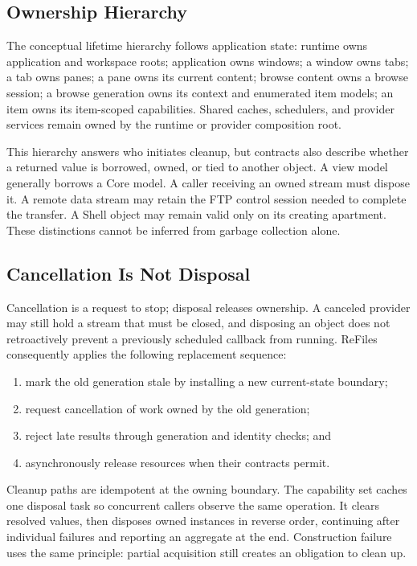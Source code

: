 \documentclass[10pt,a4paper,twoside]{article}
\begin{document}
\subsection{Ownership Hierarchy}

The conceptual lifetime hierarchy follows application state: runtime owns application and workspace roots;
application owns windows; a window owns tabs; a tab owns panes; a pane owns its current content; browse content
owns a browse session; a browse generation owns its context and enumerated item models; an item owns its
item-scoped capabilities. Shared caches, schedulers, and provider services remain owned by the runtime or provider
composition root.

This hierarchy answers who initiates cleanup, but contracts also describe whether a returned value is borrowed,
owned, or tied to another object. A view model generally borrows a Core model. A caller receiving an owned stream
must dispose it. A remote data stream may retain the FTP control session needed to complete the transfer. A Shell
object may remain valid only on its creating apartment. These distinctions cannot be inferred from garbage
collection alone.

\subsection{Cancellation Is Not Disposal}

Cancellation is a request to stop; disposal releases ownership. A canceled provider may still hold a stream that
must be closed, and disposing an object does not retroactively prevent a previously scheduled callback from
running. ReFiles consequently applies the following replacement sequence:

\begin{enumerate}[leftmargin=*]
  \item mark the old generation stale by installing a new current-state boundary;
  \item request cancellation of work owned by the old generation;
  \item reject late results through generation and identity checks; and
  \item asynchronously release resources when their contracts permit.
\end{enumerate}

Cleanup paths are idempotent at the owning boundary. The capability set caches one disposal task so concurrent
callers observe the same operation. It clears resolved values, then disposes owned instances in reverse order,
continuing after individual failures and reporting an aggregate at the end. Construction failure uses the same
principle: partial acquisition still creates an obligation to clean up.
\end{document}
